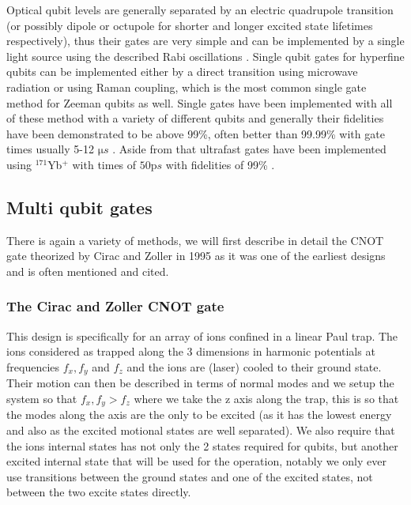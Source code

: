 Optical qubit levels are generally separated by an electric quadrupole transition (or possibly dipole or octupole for shorter and longer excited state lifetimes respectively), thus their gates are very simple and can be implemented by a single light source using the described Rabi oscillations \cite{bruzewiczTrappedionQuantumComputing2019}.
Single qubit gates for hyperfine qubits can be implemented either by a direct transition using microwave radiation or using Raman coupling, which is the most common single gate method for Zeeman qubits as well.
Single gates have been implemented with all of these method with a variety of different qubits and generally their fidelities have been demonstrated to be above 99\%, often better than 99.99\% with gate times usually 5-12 $\si{\micro s}$ \cite{bruzewiczTrappedionQuantumComputing2019}.
Aside from that ultrafast gates have been implemented using $^{171}$Yb$^+$ with times of $50\si{\pico s}$ with fidelities of 99\% \cite{campbellUltrafastGatesSingle2010}.

\subsection{Multi qubit gates}
There is again a variety of methods, we will first describe in detail the CNOT gate theorized by Cirac and Zoller in 1995 \cite{ciracQuantumComputationsCold1995} as it was one of the earliest designs and is often mentioned and cited.

\subsubsection{The Cirac and Zoller CNOT gate \cite{ciracQuantumComputationsCold1995}}
This design is specifically for an array of ions confined in a linear Paul trap.
The ions considered as trapped along the 3 dimensions in harmonic potentials at frequencies $f_x, f_y$ and $f_z$ and the ions are (laser) cooled to their ground state.
Their motion can then be described in terms of normal modes and we setup the system so that $f_x, f_y > f_z$ where we take the z axis along the trap, this is so that the modes along the axis are the only to be excited (as it has the lowest energy and also as the excited motional states are well separated).
We also require that the ions internal states has not only the 2 states required for qubits, but another excited internal state that will be used for the operation, notably we only ever use transitions between the ground states and one of the excited states, not between the two excite states directly.

